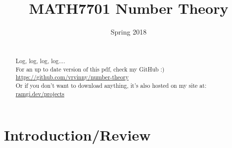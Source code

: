 \documentclass[11pt]{article}
\begin{document}
\newtheorem{theorem}{Theorem}[section]
\newtheorem{definition}[theorem]{Definition}
\newtheorem{proposition}[theorem]{Proposition}
\newtheorem{corollary}[theorem]{Corollary}
\newtheorem{lemma}[theorem]{Lemma}

\title{MATH7701 Number Theory}
	\author{ }
	\date{Spring 2018}
	\maketitle


\newpage
	\begin{abstract}

		\\[1em]
		Log, log, log, log....\\[2em]

		For an up to date version of this pdf, check my GitHub :)\\[0.5em]
		\href{https://github.com/vrvinny/number-theory}{https://github.com/vrvinny/number-theory}
		$ $\\[1em]
		Or if you don't want to download anything, it's also hosted on my site at: \\[0.5em] \href{https://ramgi.dev/projects}{ramgi.dev/projects}

	\end{abstract}
\newpage
\tableofcontents{}
\newpage
	\section{Introduction/Review}
\end{document}
